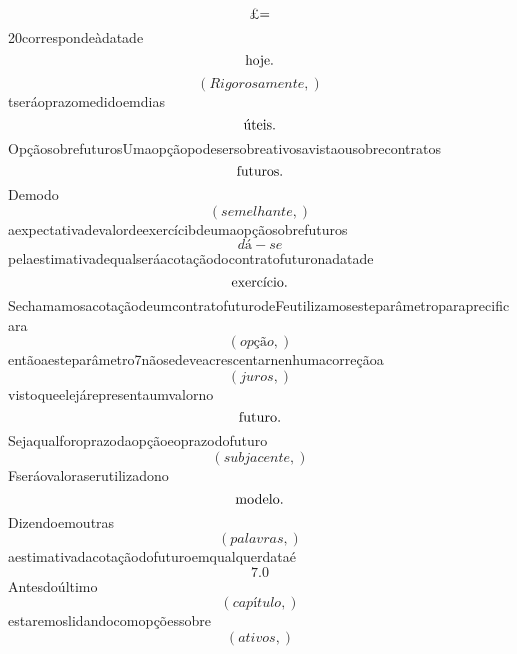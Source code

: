 \documentclass{article}
\begin{document}
\begin{equation}
$£=$
\end{equation}20correspondeàdatade\begin{equation}
$hoje.$
\end{equation}\begin{equation}
\left( Rigorosamente,\right)
\end{equation}tseráoprazomedidoemdias\begin{equation}
$úteis.$
\end{equation}OpçãosobrefuturosUmaopçãopodesersobreativosavistaousobrecontratos\begin{equation}
$futuros.$
\end{equation}Demodo\begin{equation}
\left( semelhante,\right)
\end{equation}aexpectativadevalordeexercícibdeumaopçãosobrefuturos\begin{equation}
dá - se
\end{equation}pelaestimativadequalseráacotaçãodocontratofuturonadatade\begin{equation}
$exercício.$
\end{equation}SechamamosacotaçãodeumcontratofuturodeFeutilizamosesteparâmetroparaprecificara\begin{equation}
\left( opção,\right)
\end{equation}entãoaesteparâmetro7nãosedeveacrescentarnenhumacorreçãoa\begin{equation}
\left( juros,\right)
\end{equation}vistoqueelejárepresentaumvalorno\begin{equation}
$futuro.$
\end{equation}Sejaqualforoprazodaopçãoeoprazodofuturo\begin{equation}
\left( subjacente,\right)
\end{equation}Fseráovaloraserutilizadono\begin{equation}
$modelo.$
\end{equation}Dizendoemoutras\begin{equation}
\left( palavras,\right)
\end{equation}aestimativadacotaçãodofuturoemqualquerdataé\begin{equation}
7.0
\end{equation}Antesdoúltimo\begin{equation}
\left( capítulo,\right)
\end{equation}estaremoslidandocomopçõessobre\begin{equation}
\left( ativos,\right)

\end{equation}
\end{document}
